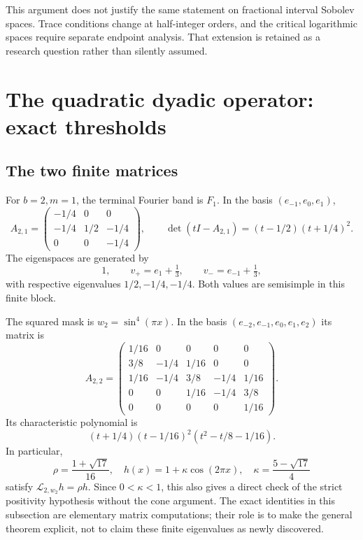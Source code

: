 \documentclass[11pt,a4paper]{article}
\theoremstyle{definition}
\theoremstyle{remark}
\newcommand{\Lop}{\mathcal L}
\numberwithin{equation}{section}
\begin{document}
This argument does not justify the same statement on fractional interval
Sobolev spaces. Trace conditions change at half-integer orders, and the
critical logarithmic spaces require separate endpoint analysis. That
extension is retained as a research question rather than silently assumed.

\section{The quadratic dyadic operator: exact thresholds}
\label{sec:dyadic-spectrum}

\subsection{The two finite matrices}
For $b=2,m=1$, the terminal Fourier band is $F_1$. In the basis
$(e_{-1},e_0,e_1)$,
\begin{equation}
 A_{2,1}=\begin{pmatrix}
 -1/4&0&0\\[-1mm]
 -1/4&1/2&-1/4\\[-1mm]
 0&0&-1/4
 \end{pmatrix},\qquad
 \det(tI-A_{2,1})=(t-1/2)(t+1/4)^2.
 \label{eq:A21}
\end{equation}
The eigenspaces are generated by
\begin{equation}
 1,\qquad v_+=e_1+\tfrac13,\qquad v_-=e_{-1}+\tfrac13,
 \label{eq:primal-eigenfunctions}
\end{equation}
with respective eigenvalues $1/2,-1/4,-1/4$. Both values are semisimple
in this finite block.

The squared mask is $w_2=\sin^4(\pi x)$. In the basis
$(e_{-2},e_{-1},e_0,e_1,e_2)$ its matrix is
\begin{equation}
 A_{2,2}=\begin{pmatrix}
 1/16&0&0&0&0\\
 3/8&-1/4&1/16&0&0\\
 1/16&-1/4&3/8&-1/4&1/16\\
 0&0&1/16&-1/4&3/8\\
 0&0&0&0&1/16
 \end{pmatrix}.
 \label{eq:A22}
\end{equation}
Its characteristic polynomial is
\begin{equation}
 (t+1/4)(t-1/16)^2(t^2-t/8-1/16).
 \label{eq:A22-char}
\end{equation}
In particular,
\begin{equation}
 \rho=\frac{1+\sqrt{17}}{16},\quad
 h(x)=1+\kappa\cos(2\pi x),\quad
 \kappa=\frac{5-\sqrt{17}}4
 \label{eq:explicit-h}
\end{equation}
satisfy $\Lop_{2,w_2}h=\rho h$. Since $0<\kappa<1$, this also gives
a direct check of the strict positivity hypothesis without the cone
argument. The exact identities in this subsection are elementary matrix
computations; their role is to make the general theorem explicit, not to
claim these finite eigenvalues as newly discovered.
\end{document}
